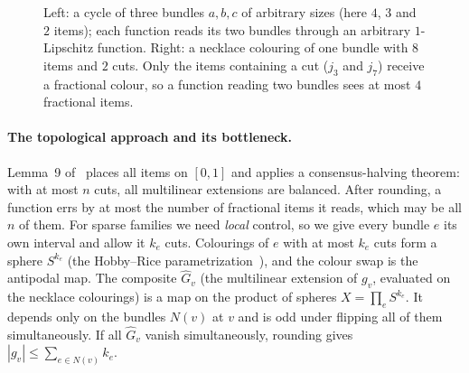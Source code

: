 \documentclass[11pt,letterpaper]{article}
\theoremstyle{definition}
\newcommand{\hG}{\widehat{G}}
\begin{document}
\begin{figure}[t]
\centering
{}
\caption{Left: a cycle of three bundles $a,b,c$ of arbitrary sizes (here $4$, $3$ and $2$ items);
each function reads its two bundles through an arbitrary $1$-Lipschitz function. Right: a necklace
colouring of one bundle with $8$ items and $2$ cuts. Only the items containing a cut ($j_3$ and
$j_7$) receive a fractional colour, so a function reading two bundles sees at most $4$ fractional
items.}
\label{fig:cycle}
\end{figure}

\paragraph{The topological approach and its bottleneck.}
Lemma~9 of~\cite{HMMS25} places all items on $[0,1]$ and applies a consensus-halving theorem: with
at most $n$ cuts, all multilinear extensions are balanced. After rounding, a function errs by at
most the number of fractional items it reads, which may be all $n$ of them. For sparse families
we need \emph{local} control, so we give every bundle $e$ its own interval and allow it $k_e$
cuts. Colourings of $e$ with at most $k_e$ cuts form a sphere $S^{k_e}$ (the Hobby--Rice
parametrization~\cite{HR65,Pin76}), and the colour swap is the antipodal map. The composite
$\hG_v$ (the multilinear extension of $g_v$, evaluated on the necklace colourings) is a map on
the product of spheres $X=\prod_eS^{k_e}$. It depends only on the bundles $N(v)$ at $v$ and is
odd under flipping all of them simultaneously. If all $\hG_v$ vanish simultaneously, rounding
gives $|g_v|\le\sum_{e\in N(v)}k_e$.
\end{document}
